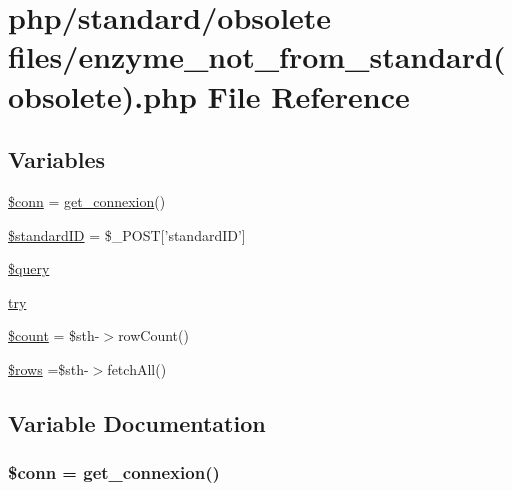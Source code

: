 \hypertarget{enzyme__not__from__standard_07obsolete_08_8php}{\section{php/standard/obsolete files/enzyme\-\_\-not\-\_\-from\-\_\-standard(obsolete).php File Reference}
\label{enzyme__not__from__standard_07obsolete_08_8php}
}
\subsection*{Variables}
\begin{DoxyCompactItemize}
\item 
\hyperlink{enzyme__not__from__standard_07obsolete_08_8php_aa8a5a87b9c1a6a0819b88447cbe41877}{\$conn} = \hyperlink{php__functions_8php_ace18bc10f3fd08f92688ac743e0d8c2e}{get\-\_\-connexion}()
\item 
\hyperlink{enzyme__not__from__standard_07obsolete_08_8php_a0c541a369e4a0434108a7d145751bb23}{\$standard\-I\-D} = \$\-\_\-\-P\-O\-S\-T\mbox{[}'standard\-I\-D'\mbox{]}
\item 
\hyperlink{enzyme__not__from__standard_07obsolete_08_8php_af59a5f7cd609e592c41dc3643efd3c98}{\$query}
\item 
\hyperlink{enzyme__not__from__standard_07obsolete_08_8php_abe4cc9788f52e49485473dc699537388}{try}
\item 
\hyperlink{enzyme__not__from__standard_07obsolete_08_8php_af789423037bbc89dc7c850e761177570}{\$count} = \$sth-\/$>$row\-Count()
\item 
\hyperlink{enzyme__not__from__standard_07obsolete_08_8php_ace2ec39e7df3899fa8df9640ec274b03}{\$rows} =\$sth-\/$>$fetch\-All()
\end{DoxyCompactItemize}


\subsection{Variable Documentation}
\hypertarget{enzyme__not__from__standard_07obsolete_08_8php_aa8a5a87b9c1a6a0819b88447cbe41877}{
\subsubsection[{\$conn}]{\setlength{\rightskip}{0pt plus 5cm}\$conn = {\bf get\-\_\-connexion}()}}\label{enzyme__not__from__standard_07obsolete_08_8php_aa8a5a87b9c1a6a0819b88447cbe41877}


